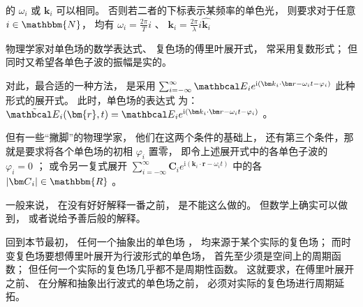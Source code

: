 \begin{corollary}
{		的 $ {\omega _i} $ 或 $ { {\bm k}_i} $ 可以相同。 否则若二者的下标表示某频率的单色光， 则要求对于任意
		$ i \in \mathbbm{N} $， 均有 $ {\omega_i} = \frac{{2\pi }}{T}i $ 、 
		$ {{\bm k}_i} = \frac{{2\pi }}{\lambda }i\widehat {{{\bm k}_i}} $ 
	}
\end{corollary}

物理学家对单色场的数学表达式、 复色场的傅里叶展开式， 常采用复数形式； 但同时又希望各单色子波的振幅是实的。

对此，最合适的一种方法， 是采用 $ \sum\nolimits_{i =  - \infty }^\infty  {{{\mathbcal E}_i}{e^{{\mathrm i}({{\bm k}_i} \cdot {\bm r} - {\omega _i}t - \varphi_i)}}} $ 
此种形式的展开式。 此时，单色场的表达式
为：$ \tilde {{\mathbcal E}_i}(\bm{r},t) = {{{\mathbcal E}_i}{e^{{\mathrm i}({{\bm k}_i} \cdot {\bm r} - {\omega _i}t - \varphi_i)}}} $ 。

但有一些“撇脚”的物理学家， 他们在这两个条件的基础上， 还有第三个条件，那就是要求将各个单色场的初相 $ \varphi_i $ 置零， 
即令上述展开式中的各单色子波的 $ \varphi_i = 0 $ ； 或令另一复式展开
 $ \sum\nolimits_{i =  - \infty }^\infty  {{{\bm C}_i}{e^{{\mathrm i}({{\bm k}_i} \cdot {\bm r} - {\omega _i}t)}}} $ 
中的各 $ \left| {\bm C}_i \right| \in \mathbbm{R} $ 。

一般来说， 在没有好好解释一番之前， 是不能这么做的。 但数学上确实可以做到， 或者说给予善后般的解释。 

回到本节最初， 任何一个抽象出的单色场
， 均来源于某个实际的复色场； 而时变复色场要想傅里叶展开为行波形式的单色场， 
首先至少须是空间上的周期函数； 但任何一个实际的复色场几乎都不是周期性函数。 这就要求，在傅里叶展开之前、 
在分解和抽象出行波式的单色场之前， 必须对实际的复色场进行周期延拓。

